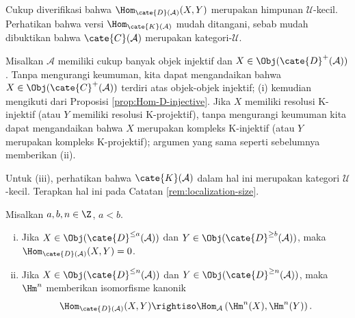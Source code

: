 \begin{bukti}
	Cukup diverifikasi bahwa
	$\Hom_{\cate{D}(\mathcal{A})}(X, Y)$ merupakan himpunan
	$\mathcal{U}$-kecil. Perhatikan bahwa versi
	$\Hom_{\cate{K}(\mathcal{A})}$ mudah ditangani, sebab mudah dibuktikan bahwa
	$\cate{C}(\mathcal{A})$ merupakan kategori-$\mathcal{U}$.

	Misalkan $\mathcal{A}$ memiliki cukup banyak objek injektif dan
	$X \in \Obj(\cate{D}^+(\mathcal{A}))$. Tanpa mengurangi keumuman, kita
	dapat mengandaikan bahwa $X \in \Obj(\cate{C}^+(\mathcal{A}))$ terdiri atas
	objek-objek injektif; (i) kemudian mengikuti dari Proposisi
	\ref{prop:Hom-D-injective}. Jika $X$ memiliki resolusi K-injektif (atau $Y$
	memiliki resolusi K-projektif), tanpa mengurangi keumuman kita dapat
	mengandaikan bahwa $X$ merupakan kompleks K-injektif (atau $Y$ merupakan
	kompleks K-projektif); argumen yang sama seperti sebelumnya memberikan (ii).

	Untuk (iii), perhatikan bahwa $\cate{K}(\mathcal{A})$ dalam hal ini
	merupakan kategori $\mathcal{U}$-kecil. Terapkan hal ini pada Catatan
	\ref{rem:localization-size}.
\end{bukti}


\begin{proposisi}[Ortogonalitas]\label{prop:derived-cat-orthogonality}
	Misalkan $a, b, n \in \Z$, $a < b$.
	\begin{enumerate}[(i)]
		\item Jika $X \in \Obj(\cate{D}^{\leq a}(\mathcal{A}))$ dan
		$Y \in \Obj(\cate{D}^{\geq b}(\mathcal{A}))$, maka
		$\Hom_{\cate{D}(\mathcal{A})}(X, Y) = 0$.
		\item Jika $X \in \Obj(\cate{D}^{\leq n}(\mathcal{A}))$ dan
		$Y \in \Obj(\cate{D}^{\geq n}(\mathcal{A}))$, maka $\Hm^n$
		memberikan isomorfisme kanonik
		\[ \Hom_{\cate{D}(\mathcal{A})}(X, Y) \rightiso \Hom_{\mathcal{A}}\left( \Hm^n(X), \Hm^n(Y) \right). \]
	\end{enumerate}
\end{proposisi}

